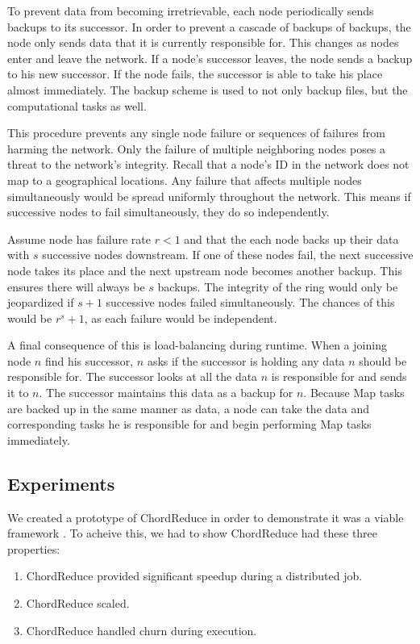 To prevent data from becoming irretrievable, each node periodically sends backups to its successor.
In order to prevent a cascade of backups of backups, the node only sends data that it is currently responsible for.
This changes as nodes enter and leave the network.
If a node's successor leaves, the node sends a backup to his new successor.
If the node fails, the successor is able to take his place almost immediately.
The backup  scheme is used to not only backup files, but the computational tasks as well.

This procedure prevents any single node failure or sequences of failures from harming the network.
Only the failure of multiple neighboring nodes poses a threat to the network's integrity.
Recall that a node's ID in the network does not map to a geographical locations.
Any failure that affects multiple nodes simultaneously would be spread uniformly throughout the network.
This means if successive nodes to fail simultaneously, they do so independently.

Assume node has failure rate $r < 1$ and that the each node backs up their data with $s$ successive nodes downstream.
If one of these nodes fail, the next successive node takes its place and the next upstream node becomes another backup.
This ensures there will always be $s$ backups.
The integrity of the ring would only be jeopardized if $s+1$ successive nodes failed simultaneously.
The chances of this would be $r^s+1$, as each failure would be independent.


A final consequence of this is load-balancing during runtime.
When a joining node $n$ find his successor, $n$ asks if the successor is holding any data $n$ should be responsible for.
The successor looks at all the data $n$ is responsible for and sends it to $n$.
The successor maintains this data as a backup for $n$.
Because Map tasks are backed up in the same manner as data, a node can take the data and corresponding tasks he is responsible for and begin performing Map tasks immediately.

\subsection{Experiments}

We created a prototype of ChordReduce in order to demonstrate it was a viable framework \cite{chordreduce}.
To acheive this, we had to show ChordReduce had these three properties:
\begin{enumerate}
	\item ChordReduce provided significant speedup during a distributed job.
	\item ChordReduce scaled.
	\item ChordReduce handled churn during execution.
\end{enumerate}


